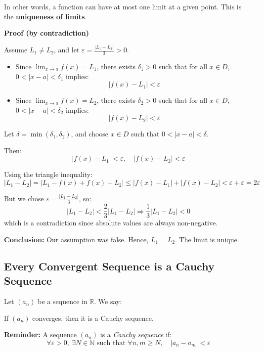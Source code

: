 In other words, a function can have at most one limit at a given point. This is the \textbf{uniqueness of limits}.

\textbf{Proof (by contradiction)}

Assume \( L_1 \ne L_2 \), and let \( \varepsilon = \frac{|L_1 - L_2|}{3} > 0 \).

\begin{itemize}[label=\(-\)]
    \item Since \( \lim_{x \to a} f(x) = L_1 \), there exists \( \delta_1 > 0 \) such that for all \( x \in D \), \( 0 < |x - a| < \delta_1 \) implies:
    \[
    |f(x) - L_1| < \varepsilon
    \]
    
    \item Since \( \lim_{x \to a} f(x) = L_2 \), there exists \( \delta_2 > 0 \) such that for all \( x \in D \), \( 0 < |x - a| < \delta_2 \) implies:
    \[
    |f(x) - L_2| < \varepsilon
    \]
\end{itemize}

Let \( \delta = \min(\delta_1, \delta_2) \), and choose \( x \in D \) such that \( 0 < |x - a| < \delta \).

Then:
\[
|f(x) - L_1| < \varepsilon, \quad |f(x) - L_2| < \varepsilon
\]

Using the triangle inequality:
\[
|L_1 - L_2| = |L_1 - f(x) + f(x) - L_2| \le |f(x) - L_1| + |f(x) - L_2| < \varepsilon + \varepsilon = 2\varepsilon
\]

But we chose \( \varepsilon = \frac{|L_1 - L_2|}{3} \), so:
\[
|L_1 - L_2| < \frac{2}{3}|L_1 - L_2| \Rightarrow \frac{1}{3}|L_1 - L_2| < 0
\]
which is a contradiction since absolute values are always non-negative.

\textbf{Conclusion:} Our assumption was false. Hence, \( L_1 = L_2 \). The limit is unique.

\QED

\subsection{Every Convergent Sequence is a Cauchy Sequence}

Let \( (a_n) \) be a sequence in \( \mathbb{R} \). We say:

If \( (a_n) \) converges, then it is a Cauchy sequence.

\textbf{Reminder:}  
A sequence \( (a_n) \) is a \emph{Cauchy sequence} if:
\[
\forall \varepsilon > 0, \ \exists N \in \mathbb{N} \text{ such that } \forall n, m \ge N, \quad |a_n - a_m| < \varepsilon
\]


